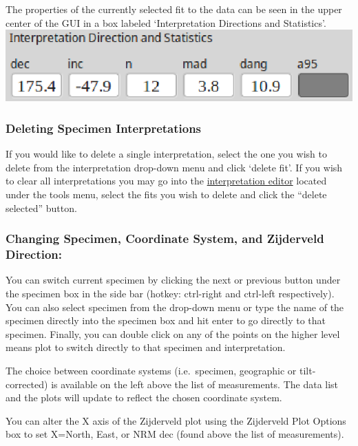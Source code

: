 \documentclass[11pt]{book}
\begin{document}
{{\noindent The properties of the currently selected fit to the data can be seen in the upper center of the GUI in a box labeled `Interpretation Directions and Statistics'.\\

\includegraphics[width=10 cm]{EPSFiles/demag_gui_FitData.eps}

\subsubsection{Deleting Specimen
Interpretations}\label{deleting-specimen-interpretations}

\noindent If you would like to delete a single interpretation, select the one you wish to delete from the interpretation drop-down menu and click `delete fit'. If you wish to clear all interpretations you may go into the \hyperref[interpretation-editor]{interpretation editor} located under the tools menu, select the fits you wish to delete and click the ``delete selected'' button.\\

\subsubsection{Changing Specimen, Coordinate System, and Zijderveld Direction:}\label{change-specimen-coord-zijd}

You can switch current specimen by clicking the next or previous button under the specimen box in the side bar (hotkey: ctrl-right and ctrl-left respectively). You can also select specimen from the drop-down menu or type the name of the specimen directly into the specimen box and hit enter to go directly to that specimen. Finally, you can double click on any of the points on the higher level means plot to switch directly to that specimen and interpretation.

\noindent The choice between coordinate systems (i.e.~specimen, geographic or tilt-corrected) is available on the left above the list of measurements. The data list and the plots will update to reflect the chosen coordinate system.

\noindent You can alter the X axis of the Zijderveld plot using the Zijderveld Plot Options box to set X=North, East, or NRM dec (found above the list of measurements).

}}
\end{document}
